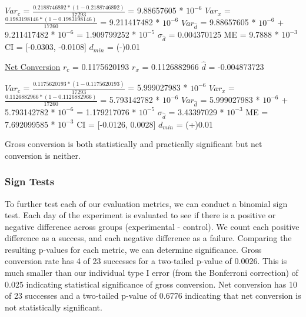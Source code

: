 \documentclass[paper=a4, fontsize=11pt]{scrartcl} %
\numberwithin{equation}{section} %
\numberwithin{figure}{section} %
\numberwithin{table}{section} %
\begin{document}
$Var_{c}$ = $\frac{0.2188746892 * (1 - 0.2188746892)}{17293}$ = 9.88657605 * $10^{-6}$
\newline
$Var_{x}$ = $\frac{0.1983198146 * (1 - 0.1983198146)}{17260}$ = 9.211417482 * $10^{-6}$
\newline
$Var_{\widehat{d}}$ = 9.88657605 * $10^{-6}$ + 9.211417482 * $10^{-6}$ = 1.909799252 * $10^{-5}$
\newline
\newline
$\sigma_{\widehat{d}}$ = 0.004370125
\newline
ME = 9.7888 * $10^{-3}$
\newline
CI = [-0.0303, -0.0108]
\newline
$d_{min}$ = (-)0.01
\newline
\newline


\underline{Net Conversion} \newline
\newline
$r_{c}$ = 0.1175620193
\quad
$r_{x}$ = 0.1126882966
\quad
$\widehat{d}$ = -0.004873723
\newline

$Var_{c}$ = $\frac{0.1175620193 * (1 - 0.1175620193)}{17293}$ = 5.999027983 * $10^{-6}$
\newline
$Var_{x}$ = $\frac{0.1126882966 * (1 - 0.1126882966)}{17260}$ =  5.793142782 * $10^{-6}$
\newline
$Var_{\widehat{d}}$ = 5.999027983 * $10^{-6}$ + 5.793142782 * $10^{-6}$ = 1.179217076 * $10^{-5}$
\newline
\newline
$\sigma_{\widehat{d}}$ = 3.43397029 * $10^{-3}$
\newline
ME = 7.692099585 * $10^{-3}$
\newline
CI = [-0.0126, 0.0028]
\newline
$d_{min}$ = (+)0.01
\newline

Gross conversion is both statistically and practically significant but net conversion is neither. \newline


\subsubsection{Sign Tests}

To further test each of our evaluation metrics, we can conduct a binomial sign test.  Each day of the experiment is evaluated to see if there is a positive or negative difference across groups (experimental - control).  We count each positive difference as a success, and each negative difference as a failure.  Comparing the resulting p-values for each metric, we can determine significance.
Gross conversion rate has 4 of 23 successes for a two-tailed p-value of 0.0026.  This is much smaller than our individual type I error (from the Bonferroni correction) of 0.025 indicating statistical significance of gross conversion.  Net conversion has 10 of 23 successes and a two-tailed p-value of 0.6776 indicating that net conversion is not statistically significant.
\end{document}
